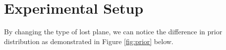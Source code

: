 \documentclass[12pt, letterpaper]{article}  %
\theoremstyle{definition}
\theoremstyle{remark}
\theoremstyle{plain}
\begin{document}
%
%
%
%
%
%
%


\section{Experimental Setup}\label{sec:experiment}

By changing the type of lost plane, we can notice the difference in prior distribution as demonstrated in Figure \ref{fig:prior} below.
\end{document}
